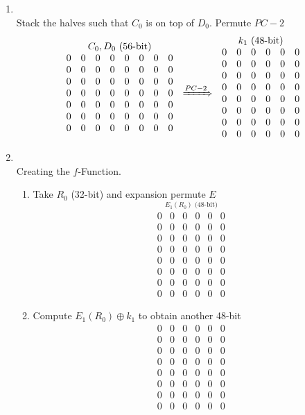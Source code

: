 \documentclass[12pt]{article}
\begin{document}
\begin{enumerate}
\begin{enumerate}
\begin{enumerate}
			\item
				\quad\\
				Stack the halves such that $C_0$ is on top of $D_0$. Permute $PC-2$
				\[
				\stackrel{\mbox{$C_0, D_0$ (56-bit)}}{
					\begin{matrix}
						0&0&0&0&0&0&0&0\\
						0&0&0&0&0&0&0&0\\
						0&0&0&0&0&0&0&0\\
						0&0&0&0&0&0&0&0\\
						0&0&0&0&0&0&0&0\\
						0&0&0&0&0&0&0&0\\
						0&0&0&0&0&0&0&0
					\end{matrix}}\quad
				\xRightarrow{PC-2}\quad
				\stackrel{\mbox{$k_1$ (48-bit)}}{
					\begin{matrix}
						0&0&0&0&0&0\\ 
						0&0&0&0&0&0\\
						0&0&0&0&0&0\\
						0&0&0&0&0&0\\
						0&0&0&0&0&0\\
						0&0&0&0&0&0\\
						0&0&0&0&0&0\\
						0&0&0&0&0&0
					\end{matrix}}
				\]
				
			\item
				\quad\\
				Creating the $f$-Function.\\
				\begin{enumerate}				
				\item
					Take $R_0$ (32-bit) and expansion permute $E$
					\[
					\stackrel{\mbox{$E_1(R_0)$ (48-bit)}}{
					\begin{matrix}
						0&0&0&0&0&0\\ 
						0&0&0&0&0&0\\
						0&0&0&0&0&0\\
						0&0&0&0&0&0\\
						0&0&0&0&0&0\\
						0&0&0&0&0&0\\
						0&0&0&0&0&0\\
						0&0&0&0&0&0
					\end{matrix}}
					\]
					
				\item
					Compute $E_1(R_0) \oplus k_1$ to obtain another 48-bit
					\[
					\begin{matrix}
						0&0&0&0&0&0\\ 
						0&0&0&0&0&0\\
						0&0&0&0&0&0\\
						0&0&0&0&0&0\\
						0&0&0&0&0&0\\
						0&0&0&0&0&0\\
						0&0&0&0&0&0\\
						0&0&0&0&0&0
					\end{matrix}
					\]
					

\end{enumerate}
\end{enumerate}
\end{enumerate}
\end{enumerate}
\end{document}
